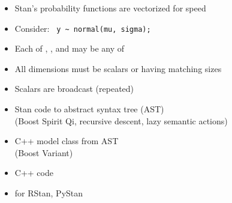 \documentclass[10pt]{report}
\begin{document}
%
\begin{itemize}
\item Stan's probability functions are vectorized for speed
\item Consider: \ \Verb|y ~ normal(mu, sigma);|
\item Each of , , and  may be any of
\item All dimensions must be scalars or having matching sizes
\item Scalars are broadcast (repeated)
\end{itemize}


%
\begin{itemize}
\item Stan code  to abstract syntax tree (AST)
  \\ {\footnotesize (Boost Spirit Qi, recursive descent, lazy semantic
    actions)}
\item C++ model class  from AST
  \\ {\footnotesize (Boost Variant)}
\item C++ code 
\item {} for RStan, PyStan
\end{itemize}




\end{document}
